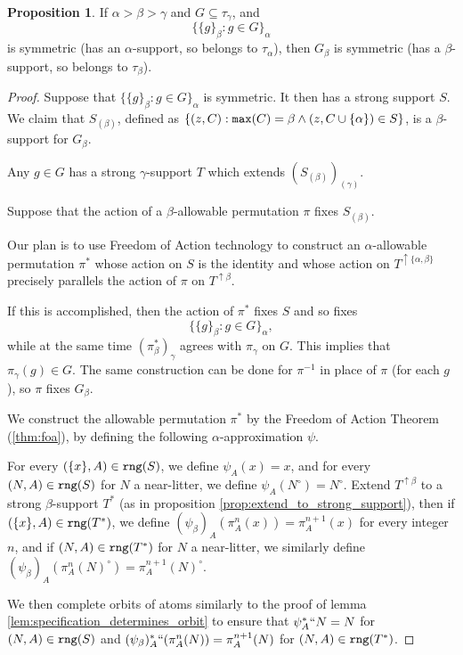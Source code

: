 \documentclass{article}
\theoremstyle{definition}
\newtheorem{proposition}[theorem]{Proposition}
\theoremstyle{remark}
\newcommand{\rk}[1]{{\color{blue}\sl #1}}
\newcommand{\rk}[1]{}
\begin{document}
\begin{proposition}\label{prop:unions_of_singletons}
If  $\alpha>\beta>\gamma$ and $G \subseteq \tau_\gamma$, and $$\{\{g\}_\beta:g \in G\}_\alpha$$ is symmetric (has an $\alpha$-support, so belongs to $\tau_\alpha$), then $G_\beta$ is symmetric (has a $\beta$-support, so belongs to $\tau_\beta$).
\end{proposition}
\begin{proof}
Suppose that $\{\{g\}_\beta:g \in G\}_\alpha$ is symmetric.  It then has a strong support $S$.  We claim that $S_{(\beta)}$, defined as $\{(z,C): {\tt max}(C)=\beta \wedge (z,C\cup \{\alpha\}) \in S\}$,  is a $\beta$-support for $G_\beta$.

Any $g \in G$ has a strong $\gamma$-support $T$ which extends $(S_{(\beta)})_{(\gamma)}$.

Suppose that the action of a $\beta$-allowable permutation $\pi$ fixes $S_{(\beta)}$.

Our plan is to use Freedom of Action technology to construct an $\alpha$-allowable permutation $\pi^*$ whose action on $S$ is the identity
and whose action on $T^{\uparrow\{\alpha,\beta\}}$ precisely parallels the action of $\pi$ on $T^{\uparrow\beta}$.

If this is accomplished, then the action of $\pi^*$ fixes $S$ and so fixes $$\{\{g\}_\beta:g \in G\}_\alpha,$$ while at the same
time $(\pi^*_\beta)_\gamma$ agrees with $\pi_\gamma$ on $G$.  This implies that $\pi_\gamma(g) \in G$.  The same construction can be done for $\pi^{-1}$ in place of $\pi$ (for each $g$), 
so $\pi$ fixes $G_\beta$.

We construct the allowable permutation $\pi^*$ by the Freedom of Action Theorem (\ref{thm:foa}), by defining the following $\alpha$-approximation $\psi$.

For every $(\{x\},A) \in {\tt rng}(S)$, we define $\psi_A(x) = x$, and for every $(N,A) \in {\tt rng}(S)$ for $N$ a near-litter, we define $\psi_A(N^\circ) = N^\circ$.
Extend $T^{\uparrow\beta}$ to a strong $\beta$-support $T^*$ {(as in proposition \ref{prop:extend_to_strong_support})}, then if $(\{x\},A) \in {\tt rng}(T^*)$, we define $(\psi_\beta)_A(\pi^n_A(x)) = \pi^{n+1}_A(x)$ for every integer $n$, and if $(N,A) \in {\tt rng}(T^*)$ for $N$ a near-litter, we similarly define $(\psi_\beta)_A(\pi^n_A(N)^\circ) = \pi^{n+1}_A(N)^\circ$.

We then complete orbits of atoms similarly to the proof of lemma \ref{lem:specification_determines_orbit} to ensure that $\psi_A^*``N = N$ for $(N,A) \in {\tt rng}(S)$ and $(\psi_\beta)_A^*``(\pi^n_A(N)) = \pi^{n+1}_A(N)$ for $(N,A) \in {\tt rng}(T^*)$.


\end{proof}
\end{document}
